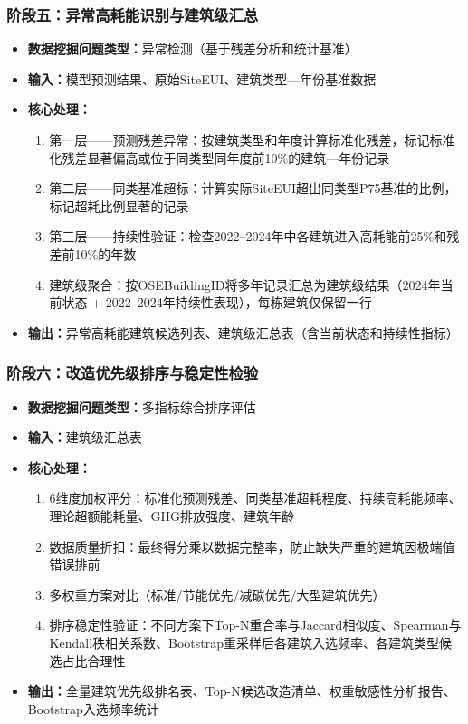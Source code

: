 \subsubsection{阶段五：异常高耗能识别与建筑级汇总}

\begin{itemize}
    \item \textbf{数据挖掘问题类型：}异常检测（基于残差分析和统计基准）
    \item \textbf{输入：}模型预测结果、原始SiteEUI、建筑类型—年份基准数据
    \item \textbf{核心处理：}
    \begin{enumerate}
        \item 第一层——预测残差异常：按建筑类型和年度计算标准化残差，标记标准化残差显著偏高或位于同类型同年度前10\%的建筑—年份记录
        \item 第二层——同类基准超标：计算实际SiteEUI超出同类型P75基准的比例，标记超耗比例显著的记录
        \item 第三层——持续性验证：检查2022--2024年中各建筑进入高耗能前25\%和残差前10\%的年数
        \item 建筑级聚合：按OSEBuildingID将多年记录汇总为建筑级结果（2024年当前状态 + 2022--2024年持续性表现），每栋建筑仅保留一行
    \end{enumerate}
    \item \textbf{输出：}异常高耗能建筑候选列表、建筑级汇总表（含当前状态和持续性指标）
\end{itemize}

\subsubsection{阶段六：改造优先级排序与稳定性检验}

\begin{itemize}
    \item \textbf{数据挖掘问题类型：}多指标综合排序评估
    \item \textbf{输入：}建筑级汇总表
    \item \textbf{核心处理：}
    \begin{enumerate}
        \item 6维度加权评分：标准化预测残差、同类基准超耗程度、持续高耗能频率、理论超额能耗量、GHG排放强度、建筑年龄
        \item 数据质量折扣：最终得分乘以数据完整率，防止缺失严重的建筑因极端值错误排前
        \item 多权重方案对比（标准/节能优先/减碳优先/大型建筑优先）
        \item 排序稳定性验证：不同方案下Top-N重合率与Jaccard相似度、Spearman与Kendall秩相关系数、Bootstrap重采样后各建筑入选频率、各建筑类型候选占比合理性
    \end{enumerate}
    \item \textbf{输出：}全量建筑优先级排名表、Top-N候选改造清单、权重敏感性分析报告、Bootstrap入选频率统计
\end{itemize}

